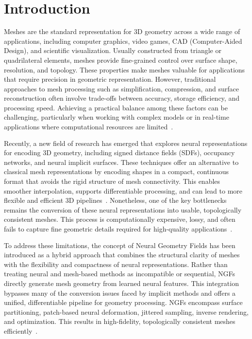 \section{Introduction}\label{sec:introduction}

Meshes are the standard representation for 3D geometry across a wide range of applications, including computer graphics, video games, CAD (Computer-Aided Design), and scientific visualization.  
Usually constructed from triangle or quadrilateral elements, meshes provide fine-grained control over surface shape, resolution, and topology.  
These properties make meshes valuable for applications that require precision in geometric representation.  
However, traditional approaches to mesh processing such as simplification, compression, and surface reconstruction often involve trade-offs between accuracy, storage efficiency, and processing speed.  
Achieving a practical balance among these factors can be challenging, particularly when working with complex models or in real-time applications where computational resources are limited~\cite{maglo2015}.  

Recently, a new field of research has emerged that explores neural representations for encoding 3D geometry, including signed distance fields (SDFs), occupancy networks, and neural implicit surfaces.  
These techniques offer an alternative to classical mesh representations by encoding shapes in a compact, continuous format that avoids the rigid structure of mesh connectivity.  
This enables smoother interpolation, supports differentiable processing, and can lead to more flexible and efficient 3D pipelines~\cite{park2019}.  
Nonetheless, one of the key bottlenecks remains the conversion of these neural representations into usable, topologically consistent meshes.  
This process is computationally expensive, lossy, and often fails to capture fine geometric details required for high-quality applications~\cite{sivaram2024}.  

To address these limitations, the concept of Neural Geometry Fields has been introduced as a hybrid approach that combines the structural clarity of meshes with the flexibility and compactness of neural representations.  
Rather than treating neural and mesh-based methods as incompatible or sequential, NGFs directly generate mesh geometry from learned neural features.  
This integration bypasses many of the conversion issues faced by implicit methods and offers a unified, differentiable pipeline for geometry processing.  
NGFs encompass surface partitioning, patch-based neural deformation, jittered sampling, inverse rendering, and optimization.  
This results in high-fidelity, topologically consistent meshes efficiently~\cite{sivaram2024}.  

